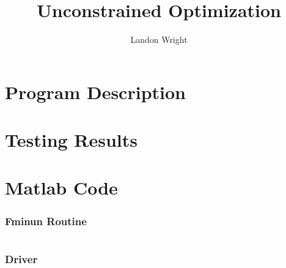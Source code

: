 \documentclass{article}
\begin{document}
\title{Unconstrained Optimization}
\author{Landon Wright}
\maketitle
\section{Program Description}
\section{Testing Results}
\section{Matlab Code}
\subsubsection{Fminun Routine}
\inputminted[xleftmargin=20pt,linenos]{matlab}{fminun.m}
\subsubsection{Driver}
\inputminted[xleftmargin=20pt,linenos]{matlab}{fminunDriv.m}


\end{document}
